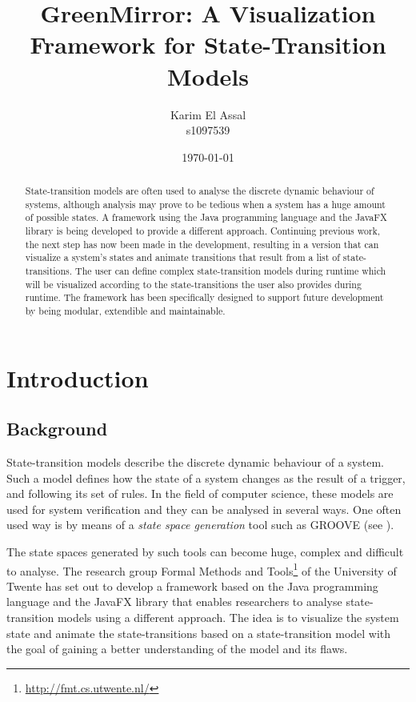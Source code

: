 \documentclass[a4paper]{article}
\title{GreenMirror: A Visualization Framework for State-Transition Models}
\author{Karim El Assal \\ s1097539}
\date{\today}
\begin{document}
\maketitle

\begin{abstract}
State-transition models are often used to analyse the discrete dynamic behaviour of systems, although analysis may prove to be tedious when a system has a huge amount of possible states. A framework using the Java programming language and the JavaFX library is being developed to provide a different approach. Continuing previous work, the next step has now been made in the development, resulting in a version that can visualize a system's states and animate transitions that result from a list of state-transitions. The user can define complex state-transition models during runtime which will be visualized according to the state-transitions the user also provides during runtime. The framework has been specifically designed to support future development by being modular, extendible and maintainable.

\end{abstract}

\newpage
\tableofcontents

\newpage




\section{Introduction}

\subsection{Background}\label{subsec:background}
State-transition models describe the discrete dynamic behaviour of a system. Such a model defines how the state of a system changes as the result of a trigger, and following its set of rules. In the field of computer science, these models are used for system verification and they can be analysed in several ways. One often used way is by means of a \emph{state space generation} tool such as GROOVE (see \cite{rensink2004}).

The state spaces generated by such tools can become huge, complex and difficult to analyse. The research group Formal Methods and Tools\footnote{\url{http://fmt.cs.utwente.nl/}} of the University of Twente has set out to develop a framework based on the Java programming language and the JavaFX library that enables researchers to analyse state-transition models using a different approach. The idea is to visualize the system state and animate the state-transitions based on a state-transition model with the goal of gaining a better understanding of the model and its flaws.
\end{document}
